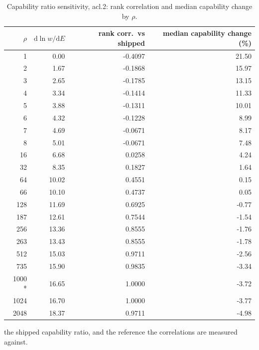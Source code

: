 \begin{table}[htbp]
  \centering
  \caption{Capability ratio sensitivity, acl.2: rank correlation and median capability change by $\rho$.}
  \label{tab:rho-acl-2-summary}
  \begin{tabular}{r r r r}
    \toprule
    $\rho$ & $\mathrm{d}\ln w/\mathrm{d}E$ & rank corr.\ vs shipped & median capability change (\%) \\
    \midrule
    1 & 0.00 & -0.4097 & 21.50 \\
    2 & 1.67 & -0.1868 & 15.97 \\
    3 & 2.65 & -0.1785 & 13.15 \\
    4 & 3.34 & -0.1414 & 11.33 \\
    5 & 3.88 & -0.1311 & 10.01 \\
    6 & 4.32 & -0.1228 & 8.99 \\
    7 & 4.69 & -0.0671 & 8.17 \\
    8 & 5.01 & -0.0671 & 7.48 \\
    16 & 6.68 & 0.0258 & 4.24 \\
    32 & 8.35 & 0.1827 & 1.64 \\
    64 & 10.02 & 0.4551 & 0.15 \\
    66 & 10.10 & 0.4737 & 0.05 \\
    128 & 11.69 & 0.6925 & -0.77 \\
    187 & 12.61 & 0.7544 & -1.54 \\
    256 & 13.36 & 0.8555 & -1.76 \\
    263 & 13.43 & 0.8555 & -1.78 \\
    512 & 15.03 & 0.9711 & -2.56 \\
    735 & 15.90 & 0.9835 & -3.34 \\
    1000 * & 16.65 & 1.0000 & -3.72 \\
    1024 & 16.70 & 1.0000 & -3.77 \\
    2048 & 18.37 & 0.9711 & -4.98 \\
    \bottomrule
  \end{tabular}
  \par\smallskip\footnotesize * the shipped capability ratio, and the reference the correlations are measured against.
\end{table}
